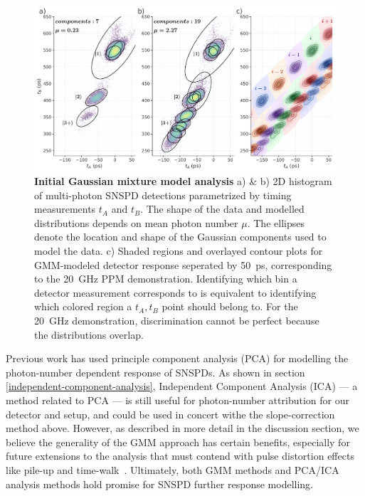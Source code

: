 \documentclass[11pt]{caltech_thesis} %
\begin{document}
\hypertarget{fig:gmm_model}{%
\begin{figure}
\centering
\includegraphics[width=1\textwidth,height=\textheight]{./chapter_04/figs/gmm_intro_analysis_t_light.pdf}
\caption[{Initial Gaussian mixture model analysis}]{\textbf{Initial Gaussian mixture model analysis} a) \& b) 2D histogram of multi-photon SNSPD detections parametrized by timing measurements $t_A$ and $t_B$. The shape of the data and modelled distributions depends on mean photon number $\mu$. The ellipses denote the location and shape of the Gaussian components used to model the data. c) Shaded regions and overlayed contour plots for GMM-modeled detector response seperated by 50~ps, corresponding to the 20~GHz PPM demonstration. Identifying which bin a detector measurement corresponds to is equivalent to identifying which colored region a $t_A, t_B$ point should belong to. For the 20~GHz demonstration, discrimination cannot be perfect because the distributions overlap.}
\label{fig:gmm_model}
\end{figure}
}

Previous work has used principle component analysis (PCA) for modelling the photon-number dependent response of SNSPDs. As shown in section \ref{independent-component-analysis}, Independent Component Analysis (ICA) --- a method related to PCA --- is still useful for photon-number attribution for our detector and setup, and could be used in concert withe the slope-correction method above. However, as described in more detail in the discussion section, we believe the generality of the GMM approach has certain benefits, especially for future extensions to the analysis that must contend with pulse distortion effects like pile-up and time-walk~\autocite{Mueller2023}. Ultimately, both GMM methods and PCA/ICA analysis methods hold promise for SNSPD further response modelling.
\end{document}
